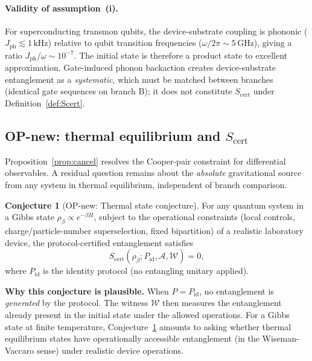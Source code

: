\documentclass[11pt]{article}
\theoremstyle{plain}
\theoremstyle{definition}
\newtheorem{conjecture}{Conjecture}[section]
\theoremstyle{remark}
\begin{document}
\paragraph{Validity of assumption~(i).}
For superconducting transmon qubits, the device-substrate coupling is phononic
($J_{\mathrm{ph}} \lesssim 1$\,kHz) relative to qubit transition frequencies
($\omega/2\pi \sim 5$\,GHz), giving a ratio $J_{\mathrm{ph}}/\omega \sim 10^{-7}$.
The initial state is therefore a product state to excellent approximation.
Gate-induced phonon backaction creates device-substrate entanglement as a \emph{systematic},
which must be matched between branches (identical gate sequences on branch B); it does
not constitute $S_{\mathrm{cert}}$ under Definition~\ref{def:Scert}.

\subsection{OP-new: thermal equilibrium and $S_{\mathrm{cert}}$}
\label{sec:OP-new}

Proposition~\ref{prop:cancel} resolves the Cooper-pair constraint for differential
observables.  A residual question remains about the \emph{absolute} gravitational
source from any system in thermal equilibrium, independent of branch comparison.

\begin{conjecture}[OP-new: Thermal state conjecture]
\label{conj:thermal}
For any quantum system in a Gibbs state $\rho_\beta \propto e^{-\beta H}$, subject to
the operational constraints (local controls, charge/particle-number superselection,
fixed bipartition) of a realistic laboratory device, the protocol-certified entanglement
satisfies
\begin{equation}
  S_{\mathrm{cert}}(\rho_\beta; P_{\mathrm{id}}, \mathcal{A}, \mathcal{W})
  = 0,
  \label{eq:thermal-conj}
\end{equation}
where $P_{\mathrm{id}}$ is the identity protocol (no entangling unitary applied).
\end{conjecture}

\textbf{Why this conjecture is plausible.}
When $P = P_{\mathrm{id}}$, no entanglement is \emph{generated} by the protocol.
The witness $\mathcal{W}$ then measures the entanglement already present in the initial
state under the allowed operations.  For a Gibbs state at finite temperature,
Conjecture~\ref{conj:thermal} amounts to asking whether thermal equilibrium states
have operationally accessible entanglement (in the Wiseman-Vaccaro sense) under
realistic device operations.
\end{document}
